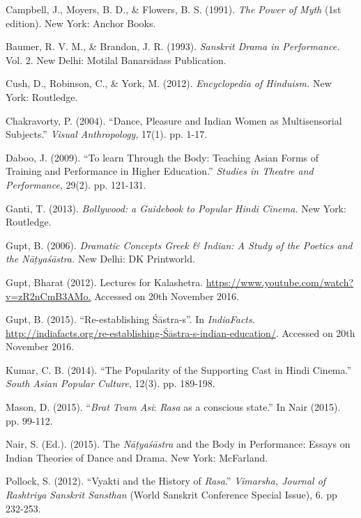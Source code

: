 \begin{thebibliography}{99}
\itemsep=2pt
Campbell, J., Moyers, B. D., \& Flowers, B. S. (1991). \textsl{The Power of Myth} (1st edition). New York: Anchor Books.

Baumer, R. V. M., \& Brandon, J. R. (1993). \textsl{Sanskrit Drama in Performance.} Vol. 2. New Delhi: Motilal Banarsidass Publication. 

Cush, D., Robinson, C., \& York, M. (2012). \textsl{Encyclopedia of Hinduism.} New York: Routledge.

Chakravorty, P. (2004). “Dance, Pleasure and Indian Women as Multisensorial Subjects.” \textsl{Visual Anthropology}, 17(1). pp. 1-17. 

Daboo, J. (2009). “To learn Through the Body: Teaching Asian Forms of Training and Performance in Higher Education.” \textsl{Studies in Theatre and Performance}, 29(2). pp. 121-131.

Ganti, T. (2013). \textsl{Bollywood: a Guidebook to Popular Hindi Cinema.} New York: Routledge. 

Gupt, B. (2006). \textsl{Dramatic Concepts Greek \& Indian: A Study of the Poetics and the Nāṭyaśāstra.} New Delhi: DK Printworld.

Gupt, Bharat (2012). Lectures for Kalashetra. \url{https://www.youtube.com/watch?v=zR2nCmB3AMo.} Accessed on 20th November 2016.

Gupt, B. (2015). “Re-establishing Śāstra-s”. In \textsl{IndiaFacts}. \url{http://indiafacts.org/re-establishing-Śāstra-s-indian-education/}. Accessed on 20th November 2016.

Kumar, C. B. (2014). “The Popularity of the Supporting Cast in Hindi Cinema.” \textsl{South Asian Popular Culture}, 12(3). pp. 189-198.

Mason, D. (2015). “\textsl{Brat Tvam Asi}: \textsl{Rasa} as a conscious state.” In Nair (2015). pp. 99-112.

Nair, S. (Ed.). (2015). The \textsl{Nāṭyaśāstra} and the Body in Performance: Essays on Indian Theories of Dance and Drama. New York: McFarland.

Pollock, S. (2012). “Vyakti and the History of \textsl{Rasa}.” \textsl{Vimarsha, Journal of Rashtriya Sanskrit Sansthan} (World Sanskrit Conference Special Issue), 6. pp 232-253.


\end{thebibliography}
